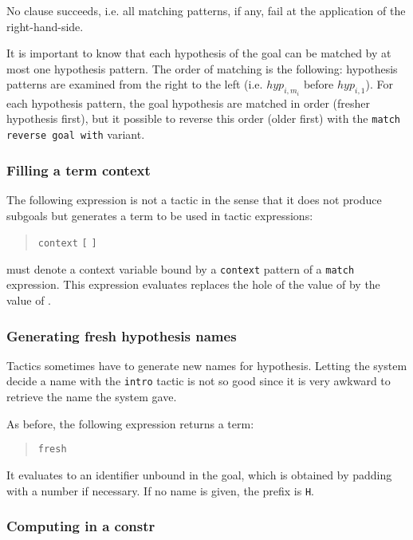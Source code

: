 \ErrMsg {}

No clause succeeds, i.e. all matching patterns, if any,
fail at the application of the right-hand-side.

\medskip

It is important to know that each hypothesis of the goal can be
matched by at most one hypothesis pattern. The order of matching is
the following: hypothesis patterns are examined from the right to the
left (i.e. $hyp_{i,m_i}$ before $hyp_{i,1}$). For each hypothesis
pattern, the goal hypothesis are matched in order (fresher hypothesis
first), but it possible to reverse this order (older first) with
the {\tt match reverse goal with} variant.

\subsubsection{Filling a term context}

The following expression is not a tactic in the sense that it does not
produce subgoals but generates a term to be used in tactic
expressions:
\begin{quote}
{\tt context} {\ident} {\tt [} {\tacexpr} {\tt ]}
\end{quote}
{\ident} must denote a context variable bound by a {\tt context}
pattern of a {\tt match} expression. This expression evaluates
replaces the hole of the value of {\ident} by the value of
{\tacexpr}.

\ErrMsg {}


\subsubsection{Generating fresh hypothesis names}

Tactics sometimes have to generate new names for hypothesis. Letting
the system decide a name with the {\tt intro} tactic is not so good
since it is very awkward to retrieve the name the system gave.

As before, the following expression returns a term:
\begin{quote}
{\tt fresh} {\qstring}
\end{quote}
It evaluates to an identifier unbound in the goal, which is obtained
by padding {\qstring} with a number if necessary. If no name is given,
the prefix is {\tt H}.

\subsubsection{Computing in a constr}

